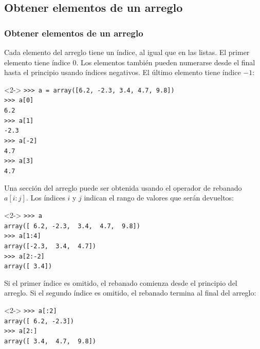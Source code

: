 \subsection{Obtener elementos de un arreglo}
\begin{frame}[fragile]
\frametitle{Obtener elementos de un arreglo}
Cada elemento del arreglo tiene un \'{i}ndice, al igual que en las listas. El primer elemento tiene \'{i}ndice $0$. Los elementos tambi\'{e}n pueden numerarse desde el final hasta el principio usando \'{i}ndices negativos. El \'{u}ltimo elemento tiene \'{i}ndice $-1$:
\fontsize{12}{12}\selectfont
\begin{exampleblock}{}<2->
\verb|>>> a = array([6.2, -2.3, 3.4, 4.7, 9.8])| \\
\pause
\verb|>>> a[0]| \\
\pause
\verb|6.2| \\
\pause
\verb|>>> a[1]| \\
\pause
\verb|-2.3| \\
\pause
\verb|>>> a[-2]| \\
\pause
\verb|4.7| \\
\pause
\verb|>>> a[3]| \\
\pause
\verb|4.7|
\end{exampleblock}
\end{frame}
\begin{frame}[fragile]
Una secci\'{o}n del arreglo puede ser obtenida usando el operador de rebanado $a[i:j]$. Los \'{i}ndices $i$ y $j$ indican el rango de valores que ser\'{a}n devueltos:
\begin{exampleblock}{}<2->
\verb|>>> a| \\
\pause
\verb|array([ 6.2, -2.3,  3.4,  4.7,  9.8])| \\
\pause
\verb|>>> a[1:4]| \\
\pause
\verb|array([-2.3,  3.4,  4.7])| \\
\pause
\verb|>>> a[2:-2]| \\
\pause
\verb|array([ 3.4])|
\end{exampleblock}
\end{frame}
\begin{frame}[fragile]
Si el primer \'{i}ndice es omitido, el rebanado comienza desde el principio del arreglo. Si el segundo \'{i}ndice es omitido, el rebanado termina al final del arreglo:
\begin{exampleblock}{}<2->
\verb|>>> a[:2]| \\
\pause
\verb|array([ 6.2, -2.3])| \\
\pause
\verb|>>> a[2:]| \\
\pause
\verb|array([ 3.4,  4.7,  9.8])|
\end{exampleblock}
\end{frame}

